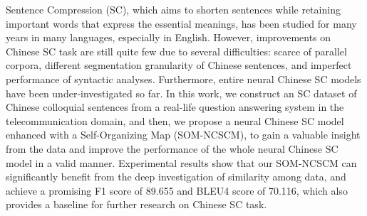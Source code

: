 Sentence Compression (SC), which aims to shorten sentences while retaining important words that express the essential meanings, has been studied for many years in many languages, especially in English. However, improvements on Chinese SC task are still quite few due to several difficulties: scarce of parallel corpora, different segmentation granularity of Chinese sentences, and imperfect performance of syntactic analyses. Furthermore, entire neural Chinese SC models have been under-investigated so far. In this work, we construct an SC dataset of Chinese colloquial sentences from a real-life question answering system in the telecommunication domain, and then, we propose a neural Chinese SC model enhanced with a Self-Organizing Map (SOM-NCSCM), to gain a valuable insight from the data and improve the performance of the whole neural Chinese SC model in a valid manner. Experimental results show that our SOM-NCSCM can significantly benefit from the deep investigation of similarity among data, and achieve a promising F1 score of 89.655 and BLEU4 score of 70.116, which also provides a baseline for further research on Chinese SC task.
